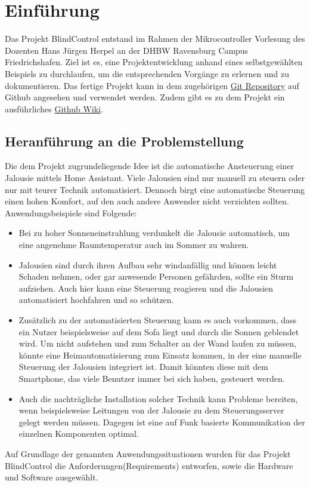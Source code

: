 \chapter{Einführung}
\label{cha:Einführung}
Das Projekt BlindControl entstand im Rahmen der Mikrocontroller Vorlesung des Dozenten Hans Jürgen Herpel an der DHBW Ravensburg Campus Friedrichshafen. Ziel ist es, eine Projektentwicklung anhand eines selbstgewählten Beispiels zu durchlaufen, um die entsprechenden Vorgänge zu erlernen und zu dokumentieren. Das fertige Projekt kann in dem zugehörigen \href{https://github.com/maxbachmann/BlindControl}{Git Repository} auf Github angesehen und verwendet werden. Zudem gibt es zu dem Projekt ein ausführliches \href{https://github.com/maxbachmann/BlindControl/wiki}{Github Wiki}.

\section{Heranführung an die Problemstellung}
Die dem Projekt zugrundeliegende Idee ist die automatische Ansteuerung einer Jalousie mittels Home Assistant. Viele Jalousien sind nur manuell zu steuern oder nur mit teurer Technik automatisiert. Dennoch birgt eine automatische Steuerung einen hohen Komfort, auf den auch andere Anwender nicht verzichten sollten. Anwendungsbeispiele sind Folgende:
\begin{itemize}
	\item Bei zu hoher Sonneneinstrahlung verdunkelt die Jalousie automatisch, um eine angenehme Raumtemperatur auch im Sommer zu wahren.
	\item Jalousien sind durch ihren Aufbau sehr windanfällig und können leicht Schaden nehmen, oder gar anwesende Personen gefährden, sollte ein Sturm aufziehen. Auch hier kann eine Steuerung reagieren und die Jalousien automatisiert hochfahren und so schützen.
	\item Zusätzlich zu der automatisierten Steuerung kann es auch vorkommen, dass ein Nutzer beispielsweise auf dem Sofa liegt und durch die Sonnen geblendet wird. Um nicht aufstehen und zum Schalter an der Wand laufen zu müssen, könnte eine Heimautomatisierung zum Einsatz kommen, in der eine manuelle Steuerung der Jalousien integriert ist. Damit könnten diese mit dem Smartphone, das viele Benutzer immer bei sich haben, gesteuert werden.
	\item Auch die nachträgliche Installation solcher Technik kann Probleme bereiten, wenn beispielsweise Leitungen von der Jalousie zu dem Steuerungsserver gelegt werden müssen. Dagegen ist eine auf Funk basierte Kommunikation der einzelnen Komponenten optimal.
\end{itemize}
Auf Grundlage der genannten Anwendungssituationen wurden für das Projekt BlindControl die Anforderungen(Requirements) entworfen, sowie die Hardware und Software ausgewählt.

